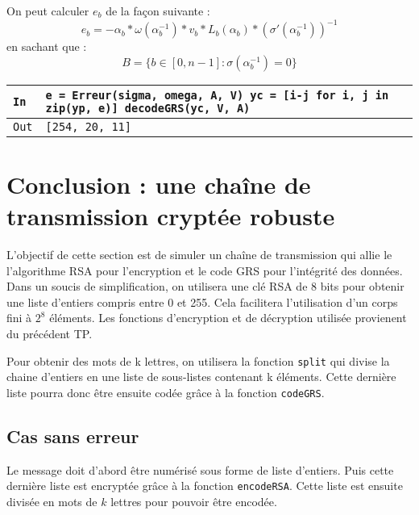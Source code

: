 \documentclass[titlepage]{article}
\begin{document}
        On peut calculer $e_b$ de la façon suivante : 
        \[e_b = -\alpha_b*\omega(\alpha_b^{-1})*v_b*L_b(\alpha_b)*(\sigma'(\alpha_b^{-1}))^{-1}\]
        en sachant que : 
        \[B = \{b \in [0,n-1] : \sigma(\alpha_b^{-1}) = 0 \}\]

        

        \begin{tabularx}{12cm}{|p{0.60cm}|X|}
            \hline
            \rowcolor{gray}
            \texttt{In}
            & 
            \texttt{e = Erreur(sigma, omega, A, V)\newline
            yc = [i-j for i, j in zip(yp, e)]\newline
            decodeGRS(yc, V, A)}
            \\
            \hline
            \texttt{Out}
            &
            \texttt{[254, 20, 11]}
            \\
            \hline
        \end{tabularx}
        \bigbreak

    \section{Conclusion : une chaîne de transmission cryptée robuste}
    L'objectif de cette section est de simuler un chaîne de transmission qui allie le l'algorithme RSA pour l'encryption et le code GRS pour l'intégrité des données.
    Dans un soucis de simplification, on utilisera une clé RSA de 8 bits pour obtenir une liste d'entiers compris entre 0 et 255. Cela facilitera l'utilisation d'un corps fini à $2^8$ éléments.
    Les fonctions d'encryption et de décryption utilisée provienent du précédent TP.
    
    Pour obtenir des mots de k lettres, on utilisera la fonction \texttt{split} qui divise la chaine d'entiers en une liste de sous-listes contenant k éléments. 
    Cette dernière liste pourra donc être ensuite codée grâce à la fonction \texttt{codeGRS}.

    

        \subsection{Cas sans erreur}

        Le message doit d'abord être numérisé sous forme de liste d'entiers. Puis cette dernière liste est encryptée grâce à la fonction \texttt{encodeRSA}. Cette liste est ensuite divisée en mots de $k$ lettres pour pouvoir être encodée.
        \bigbreak
\end{document}

